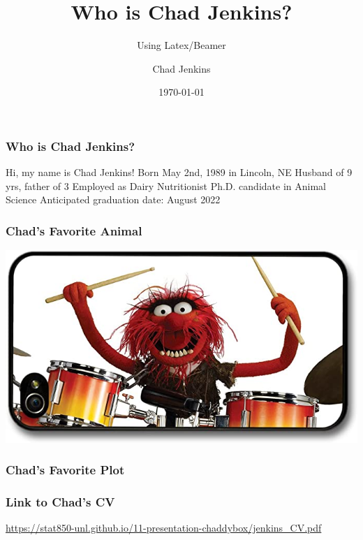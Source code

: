 \documentclass{beamer}
\title{Who is Chad Jenkins?}
\subtitle{Using Latex/Beamer}
\author{Chad Jenkins}
\institute{University of Nebraska}
\date{\today}
\begin{document}
\begin{frame}
\titlepage
\end{frame}

\begin{frame}
\frametitle{Who is Chad Jenkins?}
\begin{outline}
\1 Hi, my name is Chad Jenkins!
\2 Born May 2nd, 1989 in Lincoln, NE
\2 Husband of 9 yrs, father of 3
\2 Employed as Dairy Nutritionist
\2 Ph.D. candidate in Animal Science
\3 Anticipated graduation date: August 2022
\end{outline}
\end{frame}

\begin{frame}
\frametitle{Chad's Favorite Animal}
\includegraphics[scale=0.5]{animal}
\end{frame}

\begin{frame}
\frametitle{Chad's Favorite Plot}
\end{frame}

\begin{frame}
\frametitle{Link to Chad's CV}
\url{https://stat850-unl.github.io/11-presentation-chaddybox/jenkins_CV.pdf}
\end{frame}
\end{document}
